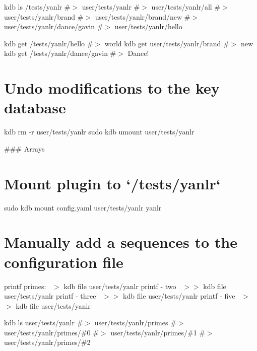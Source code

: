 kdb ls /tests/yanlr \#$>$ user/tests/yanlr \#$>$ user/tests/yanlr/all \#$>$ user/tests/yanlr/brand \#$>$ user/tests/yanlr/brand/new \#$>$ user/tests/yanlr/dance/gavin \#$>$ user/tests/yanlr/hello

kdb get /tests/yanlr/hello \#$>$ world kdb get user/tests/yanlr/brand \#$>$ new kdb get /tests/yanlr/dance/gavin \#$>$ Dance!\hypertarget{autotoc_md955_autotoc_md968}{}\section{Undo modifications to the key database}\label{autotoc_md955_autotoc_md968}
kdb rm -\/r user/tests/yanlr sudo kdb umount user/tests/yanlr 
\begin{DoxyCode}
### Arrays
\end{DoxyCode}
 \hypertarget{autotoc_md955_autotoc_md969}{}\section{Mount plugin to `/tests/yanlr`}\label{autotoc_md955_autotoc_md969}
sudo kdb mount config.\+yaml user/tests/yanlr yanlr\hypertarget{autotoc_md955_autotoc_md970}{}\section{Manually add a sequences to the configuration file}\label{autotoc_md955_autotoc_md970}
printf \textquotesingle{}primes\+:~\newline
\textquotesingle{} $>$ {\ttfamily kdb file user/tests/yanlr} printf \textquotesingle{} -\/ two~\newline
\textquotesingle{} $>$$>$ {\ttfamily kdb file user/tests/yanlr} printf \textquotesingle{} -\/ three~\newline
\textquotesingle{} $>$$>$ {\ttfamily kdb file user/tests/yanlr} printf \textquotesingle{} -\/ five~\newline
\textquotesingle{} $>$$>$ {\ttfamily kdb file user/tests/yanlr}

kdb ls user/tests/yanlr \#$>$ user/tests/yanlr/primes \#$>$ user/tests/yanlr/primes/\#0 \#$>$ user/tests/yanlr/primes/\#1 \#$>$ user/tests/yanlr/primes/\#2

